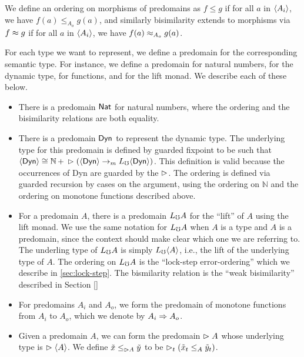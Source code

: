 
We define an ordering on morphisms of predomains as
$f \le g$ if for all $a$ in $\langle {A_i} \rangle$, we have $f(a) \le_{A_o} g(a)$,
and similarly bisimilarity extends to morphisms via
$f \approx g$ if for all $a$ in $\langle {A_i} \rangle$, we have $f(a) \approx_{A_o} g(a)$.

For each type we want to represent, we define a predomain for the corresponding semantic
type. For instance, we define a predomain for natural numbers, for the
dynamic type, for functions, and for the lift monad. We
describe each of these below.

\begin{itemize}
  \item There is a predomain $\mathsf{Nat}$ for natural numbers, where the ordering and the
  bisimilarity relations are both equality.
  
  \item There is a predomain $\mathsf{Dyn}$ to represent the dynamic type. The underlying type
  for this predomain is defined by guarded fixpoint to be such that
  $\langle {\mathsf{Dyn}} \rangle \cong \mathbb{N}\, +\, \vartriangleright (\langle {\mathsf{Dyn}} \rangle \to_m L_\mho \langle {\mathsf{Dyn}} \rangle)$.
  This definition is valid because the occurrences of Dyn are guarded by the $\vartriangleright$.
  The ordering is defined via guarded recursion by cases on the argument, using the
  ordering on $\mathbb{N}$ and the ordering on monotone functions described above.

  \item For a predomain $A$, there is a predomain $L_\mho A$ for the ``lift'' of $A$
  using the lift monad. We use the same notation for $L_\mho A$ when $A$ is a type
  and $A$ is a predomain, since the context should make clear which one we are referring to.
  The underling type of $L_\mho A$ is simply $L_\mho \langle {A} \rangle$, i.e., the lift of the underlying
  type of $A$.
  The ordering on $L_\mho A$ is the ``lock-step error-ordering'' which we describe in
  \ref{sec:lock-step}. The bismilarity relation is the ``weak bisimilarity''
  described in Section \ref{}

  \item For predomains $A_i$ and $A_o$, we form the predomain of monotone functions
  from $A_i$ to $A_o$, which we denote by $A_i \Rightarrow A_o$.

  \item Given a predomain $A$, we can form the predomain $\vartriangleright A$ whose underlying
  type is $\vartriangleright \langle {A} \rangle$. We define $\tilde{x} \le_{\vartriangleright A} \tilde{y}$ to be
  $\vartriangleright_t (\tilde{x}_t \le_A \tilde{y}_t)$.
\end{itemize}

